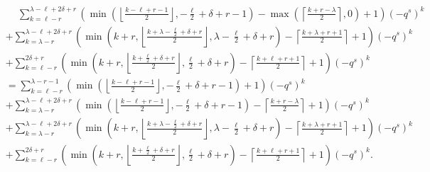 \begin{align*}
  &\phantom+ \sum_{k=\ell-r}^{\lambda-\ell+2\delta+r} \left(
    \min\left( \left\lfloor \frac{k - \ell + r - 1}{2} \right\rfloor, - \frac{\ell}{2} + \delta + r - 1 \right)
    - \max\left( \left\lceil \frac{k + r -\lambda}{2} \right\rceil, 0 \right) + 1 \right) (-q^s)^k \\
  &+ \sum_{k=\lambda-r}^{\lambda-\ell+2\delta+r} \left(
    \min\left(k+r, \left\lfloor \frac{k+\lambda-\frac{\ell}{2}+\delta+r}{2} \right\rfloor, \lambda - \frac{\ell}{2} + \delta + r \right)
    - \left\lceil \frac{k+\lambda+r+1}{2} \right\rceil + 1 \right) (-q^s)^k \\
  &+ \sum_{k=\ell-r}^{2\delta+r} \left(
    \min\left( k+r, \left\lfloor \frac{k+\frac{\ell}{2}+\delta+r}{2} \right\rfloor, \frac{\ell}{2} + \delta + r \right)
    - \left\lceil \frac{k+\ell+r+1}{2} \right\rceil + 1 \right) (-q^s)^k \\
  &= \sum_{k=\ell-r}^{\lambda-r-1} \left(
    \min\left( \left\lfloor \frac{k - \ell + r - 1}{2} \right\rfloor, - \frac{\ell}{2} + \delta + r - 1 \right)
    + 1 \right) (-q^s)^k \\
  &+ \sum_{k=\lambda-r}^{\lambda-\ell+2\delta+r} \left(
    \min\left( \left\lfloor \frac{k - \ell + r - 1}{2} \right\rfloor, - \frac{\ell}{2} + \delta + r - 1 \right)
    - \left\lceil \frac{k + r -\lambda}{2} \right\rceil + 1 \right) (-q^s)^k \\
  &+ \sum_{k=\lambda-r}^{\lambda-\ell+2\delta+r} \left(
    \min\left(k+r, \left\lfloor \frac{k+\lambda-\frac{\ell}{2}+\delta+r}{2} \right\rfloor, \lambda - \frac{\ell}{2} + \delta + r \right)
    - \left\lceil \frac{k+\lambda+r+1}{2} \right\rceil + 1 \right) (-q^s)^k \\
  &+ \sum_{k=\ell-r}^{2\delta+r} \left(
    \min\left( k+r, \left\lfloor \frac{k+\frac{\ell}{2}+\delta+r}{2} \right\rfloor, \frac{\ell}{2} + \delta + r \right)
    - \left\lceil \frac{k+\ell+r+1}{2} \right\rceil + 1 \right)(-q^s)^k .
\end{align*}

